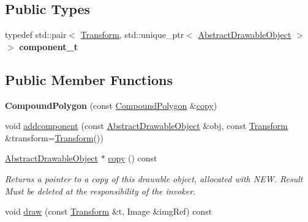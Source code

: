 \subsection*{Public Types}
\begin{DoxyCompactItemize}
\item 
\mbox{\label{classcturtle_1_1CompoundPolygon_a10c24e9f65b586dec2c4173d2e4ddc2a}} 
typedef std\+::pair$<$ \hyperlink{classcturtle_1_1Transform}{Transform}, std\+::unique\+\_\+ptr$<$ \hyperlink{classcturtle_1_1AbstractDrawableObject}{Abstract\+Drawable\+Object} $>$ $>$ {\bfseries component\+\_\+t}
\end{DoxyCompactItemize}
\subsection*{Public Member Functions}
\begin{DoxyCompactItemize}
\item 
\mbox{\label{classcturtle_1_1CompoundPolygon_a4ec03c8f5d2a8658893156ccadf0b347}} 
{\bfseries Compound\+Polygon} (const \hyperlink{classcturtle_1_1CompoundPolygon}{Compound\+Polygon} \&\hyperlink{classcturtle_1_1CompoundPolygon_af413f879d12105c9997b0e2e81e440a3}{copy})
\item 
void \hyperlink{classcturtle_1_1CompoundPolygon_a9b750af77967c4df01bab83785262e10}{addcomponent} (const \hyperlink{classcturtle_1_1AbstractDrawableObject}{Abstract\+Drawable\+Object} \&obj, const \hyperlink{classcturtle_1_1Transform}{Transform} \&transform=\hyperlink{classcturtle_1_1Transform}{Transform}())
\item 
\mbox{\label{classcturtle_1_1CompoundPolygon_af413f879d12105c9997b0e2e81e440a3}} 
\hyperlink{classcturtle_1_1AbstractDrawableObject}{Abstract\+Drawable\+Object} $\ast$ \hyperlink{classcturtle_1_1CompoundPolygon_af413f879d12105c9997b0e2e81e440a3}{copy} () const
\begin{DoxyCompactList}\small\item\em Returns a pointer to a copy of this drawable object, allocated with N\+EW. Result Must be deleted at the responsibility of the invoker. \end{DoxyCompactList}\item 
void \hyperlink{classcturtle_1_1CompoundPolygon_aee485a61907d0a9c135344eadd5c52ad}{draw} (const \hyperlink{classcturtle_1_1Transform}{Transform} \&t, Image \&img\+Ref) const
\end{DoxyCompactItemize}
